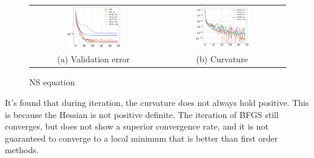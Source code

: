 \documentclass{article}
\begin{document}
\begin{figure}[hbt]
    \centering
    \begin{tabular}{cc}
    \includegraphics[width=0.45\textwidth]{figures/steadyNS.png}
    &\includegraphics[width=0.45\textwidth]{figures/steady_NS_curvcon.png} \\ 
    (a) Validation error & (b) Curvature
    \end{tabular}
    \caption{NS equation}
\label{fig:NSeqn}
\end{figure}

It's found that during iteration, the curvature does not always hold positive. This is because the Hessian is not positive definite. The iteration of BFGS still converges, but does not show a superior convergence rate, and it is not guaranteed to converge to a local minimum that is better than first order methods. 
\end{document}

